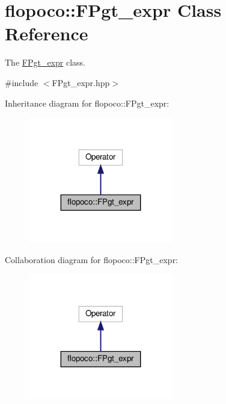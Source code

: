\hypertarget{classflopoco_1_1FPgt__expr}{}\section{flopoco\+:\+:F\+Pgt\+\_\+expr Class Reference}
\label{classflopoco_1_1FPgt__expr}


The \hyperlink{classflopoco_1_1FPgt__expr}{F\+Pgt\+\_\+expr} class.  




{\ttfamily \#include $<$F\+Pgt\+\_\+expr.\+hpp$>$}



Inheritance diagram for flopoco\+:\+:F\+Pgt\+\_\+expr\+:
\nopagebreak
\begin{figure}[H]
\begin{center}
\leavevmode
\includegraphics[width=179pt]{d6/d89/classflopoco_1_1FPgt__expr__inherit__graph}
\end{center}
\end{figure}


Collaboration diagram for flopoco\+:\+:F\+Pgt\+\_\+expr\+:
\nopagebreak
\begin{figure}[H]
\begin{center}
\leavevmode
\includegraphics[width=179pt]{d4/d33/classflopoco_1_1FPgt__expr__coll__graph}
\end{center}
\end{figure}
